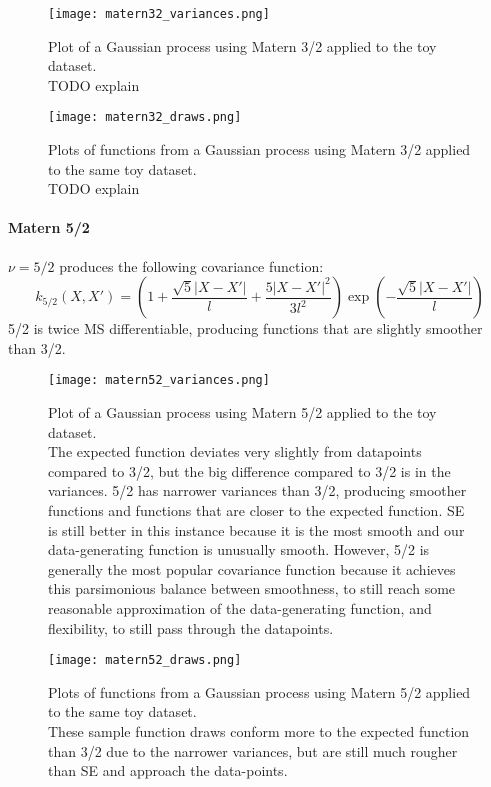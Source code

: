 \begin{figure}[H]
    \texttt{[image: matern32\_variances.png]}
    \caption{
        Plot of a Gaussian process using Matern 3/2 applied to the toy dataset. \\
        TODO explain
    }
\end{figure}

\begin{figure}[H]
    \texttt{[image: matern32\_draws.png]}
    \caption{
        Plots of functions from a Gaussian process using Matern 3/2 applied to the same toy dataset. \\
        TODO explain
    }
\end{figure}


\paragraph{Matern 5/2}
$\nu = 5/2$ produces the following covariance function:
\begin{equation*}
    k_{5/2}(X,X') = \left(1 + \frac{\sqrt{5}|X - X'|}{l} + \frac{5|X - X'|^2}{3l^2} \right) \exp \left(-\frac{\sqrt{5}|X - X'|}{l} \right)
\end{equation*}
5/2 is twice MS differentiable, producing functions that are slightly smoother than 3/2.

\begin{figure}[H]
    \texttt{[image: matern52\_variances.png]}
    \caption{
        Plot of a Gaussian process using Matern 5/2 applied to the toy dataset. \\
        The expected function deviates very slightly from datapoints compared to 3/2, but the big difference compared to 3/2 is in the variances. 5/2 has narrower variances than 3/2, producing smoother functions and functions that are closer to the expected function. SE is still better in this instance because it is the most smooth and our data-generating function is unusually smooth. However, 5/2 is generally the most popular covariance function because it achieves this parsimonious balance between smoothness, to still reach some reasonable approximation of the data-generating function, and flexibility, to still pass through the datapoints. 
    }
\end{figure}

\begin{figure}[H]
    \texttt{[image: matern52\_draws.png]}
    \caption{
        Plots of functions from a Gaussian process using Matern 5/2 applied to the same toy dataset. \\
        These sample function draws conform more to the expected function than 3/2 due to the narrower variances, but are still much rougher than SE and approach the data-points.
    }
\end{figure}

